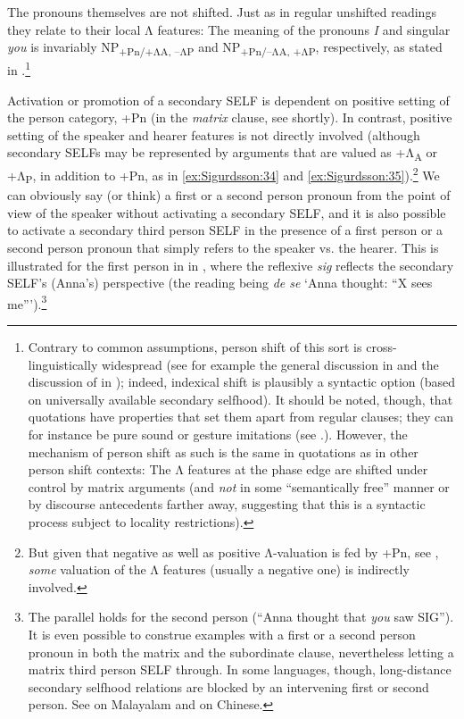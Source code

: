 \documentclass[output=paper]{LSP/langsci}
\begin{document}
The pronouns themselves are not shifted. Just as in regular unshifted readings they relate to their local Λ features: The meaning of the pronouns \textit{I} and singular \textit{you} is invariably NP\textsubscript{+Pn/+ΛA, –ΛP} and NP\textsubscript{+Pn/–ΛA, +ΛP}, respectively, as stated in .\footnote{Contrary to common assumptions, person shift of this sort is cross-linguistically widespread (see for example the general discussion in \citealt{Sigurðsson2014} and the discussion of  in \citealt{Julien2015}); indeed, indexical shift is plausibly a  syntactic option (based on universally available secondary selfhood). It should be noted, though, that quotations have properties that set them apart from regular clauses; they can for instance be pure sound or gesture imitations (see \citealt[80ff]{Anand2006}.). However, the mechanism of person shift as such is the same in quotations as in other person shift contexts: The Λ features at the phase edge are shifted under control by matrix arguments (and \textit{not} in some “semantically free” manner or by discourse antecedents farther away, suggesting that this is a syntactic process subject to locality restrictions).}

  Activation or promotion of a secondary SELF is dependent on positive setting of the person category, +Pn (in the \textit{matrix} clause, see shortly). In contrast, positive setting of the speaker and hearer features is not directly involved (although secondary SELFs may be represented by arguments that are valued as +Λ\textsubscript{A} or +Λ\textsubscript{P}, in addition to +Pn, as in \ref{ex:Sigurdsson:34} and \ref{ex:Sigurdsson:35}).\footnote{But given that negative as well as positive Λ-valuation is fed by +Pn, see , \textit{some} valuation of the Λ features (usually a negative one) is indirectly involved.} We can obviously say (or think) a first or a second person pronoun from the point of view of the speaker without activating a secondary SELF, and it is also possible to activate a secondary third person SELF in the presence of a first person or a second person pronoun that simply refers to the speaker vs. the hearer. This is illustrated for the first person in  in , where the reflexive \textit{sig} reflects the secondary SELF’s (Anna’s) perspective (the reading being \textit{de se} ‘Anna thought: “X sees me”’).\footnote{The parallel holds for the second person (“Anna thought that \textit{you} saw SIG”). It is even possible to construe examples with a first or a second person pronoun in both the matrix and the subordinate clause, nevertheless letting a matrix third person SELF through. In some languages, though, long-distance secondary selfhood relations are blocked by an intervening first or second person. See \citealt{Jayaseelan1998} on Malayalam and \citealt{Giorgi2006} on Chinese.}
\end{document}
